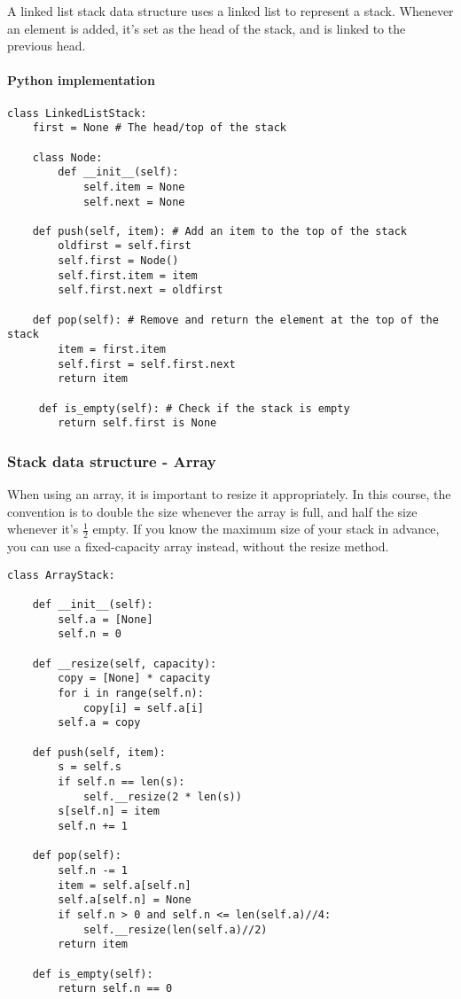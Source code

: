 \documentclass{article}
\begin{document}
A linked list stack data structure uses a linked list to represent a stack. Whenever an element is added, it's set as the head of the stack, and is linked to the previous head.

\paragraph{Python implementation}

\begin{verbatim}
class LinkedListStack:
    first = None # The head/top of the stack
    
    class Node:
        def __init__(self):
            self.item = None
            self.next = None

    def push(self, item): # Add an item to the top of the stack
        oldfirst = self.first
        self.first = Node()
        self.first.item = item
        self.first.next = oldfirst
            
    def pop(self): # Remove and return the element at the top of the stack
        item = first.item
        self.first = self.first.next
        return item

     def is_empty(self): # Check if the stack is empty
        return self.first is None
\end{verbatim}

\subsubsection{Stack data structure - Array}

When using an array, it is important to resize it appropriately. In this course, the convention is to double the size whenever the array is full, and half the size whenever it's $\frac {1} {2}$ empty. If you know the maximum size of your stack in advance, you can use a fixed-capacity array instead, without the resize method.

\begin{verbatim}
class ArrayStack:

    def __init__(self):
        self.a = [None]
        self.n = 0
        
    def __resize(self, capacity):
        copy = [None] * capacity
        for i in range(self.n):
            copy[i] = self.a[i]
        self.a = copy

    def push(self, item):
        s = self.s
        if self.n == len(s):
            self.__resize(2 * len(s))
        s[self.n] = item
        self.n += 1
        
    def pop(self):
        self.n -= 1
        item = self.a[self.n]
        self.a[self.n] = None
        if self.n > 0 and self.n <= len(self.a)//4: 
            self.__resize(len(self.a)//2)
        return item

    def is_empty(self):
        return self.n == 0
\end{verbatim}
\end{document}
